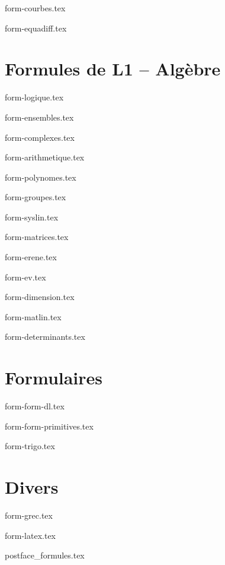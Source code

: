 \documentclass[10pt,a4paper]{article}
\begin{document}
{form-courbes.tex}

{form-equadiff.tex}


\clearpage
\part{Formules de L1 -- Algèbre}


{form-logique.tex}

{form-ensembles.tex}

{form-complexes.tex}

{form-arithmetique.tex}

{form-polynomes.tex}

{form-groupes.tex}


{form-syslin.tex}

{form-matrices.tex}

{form-erene.tex}

{form-ev.tex}

{form-dimension.tex}

{form-matlin.tex}

{form-determinants.tex}


\clearpage
\part{Formulaires}

{form-form-dl.tex}

{form-form-primitives.tex}

{form-trigo.tex}


\clearpage
\part{Divers}

{form-grec.tex}

{form-latex.tex}

{postface_formules.tex}





\bigskip
\bigskip
\end{document}
